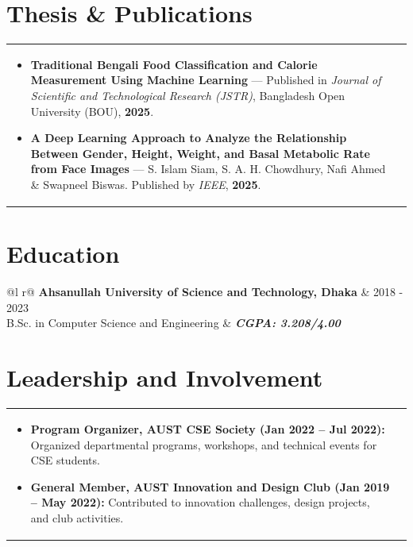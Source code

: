 \documentclass[a4paper,8pt]{article}
\begin{document}
\section{Thesis \& Publications}
\begin{tabularx}{\linewidth}{ @{}l r@{} }
\begin{minipage}[t]{\linewidth}
\begin{itemize}[nosep, after=\strut, leftmargin=1.5em, itemsep=1.5pt]
\item \textbf{Traditional Bengali Food Classification and Calorie Measurement Using Machine Learning} — Published in \textit{Journal of Scientific and Technological Research (JSTR)}, Bangladesh Open University (BOU), \textbf{2025}.
\item \textbf{A Deep Learning Approach to Analyze the Relationship Between Gender, Height, Weight, and Basal Metabolic Rate from Face Images} — S. Islam Siam, S. A. H. Chowdhury, Nafi Ahmed \& Swapneel Biswas. Published by \textit{IEEE}, \textbf{2025}.
\end{itemize}
\end{minipage}
\end{tabularx}

\vspace{1pt}
\section{Education}
\begin{tabularx}{\linewidth}{ @{}l r@{} }
\color[HTML]{1C033C} \textbf{Ahsanullah University of Science and Technology, Dhaka} & \hfill \color[HTML]{371e77} 2018 - 2023 \\
\color[HTML]{371e77} B.Sc. in Computer Science and Engineering & \hfill \color[HTML]{4B28A4} \textit{\textbf{CGPA: 3.208/4.00}} \\
\end{tabularx}

\vspace{1pt}
\section{Leadership and Involvement}
\begin{tabularx}{\linewidth}{ @{}l r@{} }
\begin{minipage}[t]{\linewidth}
\begin{itemize}[nosep,after=\strut, leftmargin=1.5em, itemsep=1.5pt]
\item \textbf{Program Organizer, AUST CSE Society (Jan 2022 – Jul 2022):} Organized departmental programs, workshops, and technical events for CSE students.
\item \textbf{General Member, AUST Innovation and Design Club (Jan 2019 – May 2022):} Contributed to innovation challenges, design projects, and club activities.
\end{itemize}
\end{minipage}
\end{tabularx}
\end{document}
